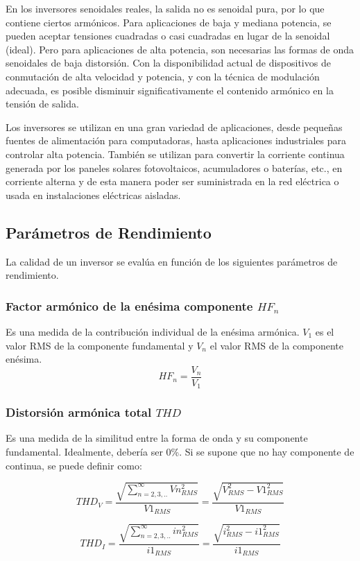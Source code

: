 \documentclass[11pt, a4paper]{article}
\begin{document}
En los inversores senoidales reales, la salida no es senoidal pura, por lo que contiene ciertos armónicos. Para aplicaciones de baja y mediana potencia, se pueden aceptar tensiones cuadradas o casi cuadradas en lugar de la senoidal (ideal). Pero para aplicaciones de alta potencia, son necesarias las formas de onda senoidales de baja distorsión. 
Con la disponibilidad actual de dispositivos de conmutación de alta velocidad y potencia, y con la técnica de modulación adecuada, es posible disminuir significativamente el contenido armónico en la tensión de salida.

Los inversores se utilizan en una gran variedad de aplicaciones, desde pequeñas fuentes de alimentación para computadoras, hasta aplicaciones industriales para controlar alta potencia. También se utilizan para convertir la corriente continua generada por los paneles solares fotovoltaicos, acumuladores o baterías, etc., en corriente alterna y de esta manera poder ser suministrada en la red eléctrica o usada en instalaciones eléctricas aisladas.

\subsection{Parámetros de Rendimiento}
La calidad de un inversor se evalúa en función de los siguientes parámetros de rendimiento.
\subsubsection{Factor armónico de la enésima componente $HF_n$}
Es una medida de la contribución individual de la enésima armónica. $V_1$ es el valor RMS de la componente fundamental y $V_n$ el valor RMS de la componente enésima.
\[ HF_n = \frac{V_n}{V_1} \]

\subsubsection{Distorsión armónica total $THD$}
Es una medida de la similitud entre la forma de onda y su componente fundamental. Idealmente, debería ser 0\%. Si se supone que no hay componente de continua, se puede definir como:

\[ THD_V = \frac{\sqrt{\sum_{n=2,3,..}^{\infty} Vn^{2}_{RMS}}}{V1_{RMS}} = \frac{\sqrt{V^{2}_{RMS} - V1^{2}_{RMS}}}{V1_{RMS}} \]

\[ THD_I = \frac{\sqrt{\sum_{n=2,3,..}^{\infty} in^{2}_{RMS}}}{i1_{RMS}} = \frac{\sqrt{i^{2}_{RMS} - i1^{2}_{RMS}}}{i1_{RMS}} \]
\end{document}
